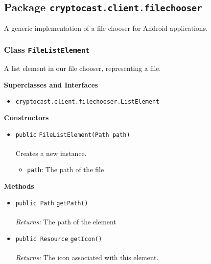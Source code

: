 \subsection{Package \lstinline!cryptocast.client.filechooser!}
A generic implementation of a file chooser for Android applications.

\subsubsection{Class \lstinline|FileListElement|}
A list element in our file chooser, representing a file. \\
\noindent\begin{minipage}[t]{5cm}
\vspace{0.3em}
\hspace*{2em}
\vspace{0.3em}
\end{minipage}



\textbf{\sffamily Superclasses and Interfaces}
\begin{itemize}
\item \lstinline|cryptocast.client.filechooser.ListElement|
\end{itemize}


\textbf{\sffamily Constructors}
\begin{itemize}
\item \lstinline|public| \lstinline|FileListElement|\lstinline|(Path path)|\\ \\[-0.6em]
Creates a new instance.
\begin{itemize}
\item \lstinline|path|: The path of the file
\end{itemize}



\end{itemize}


\textbf{\sffamily Methods}
\begin{itemize}
\item \lstinline|public Path| \lstinline|getPath|\lstinline|()|\\ \\[-0.6em]
\emph{Returns:} The path of the element



\item \lstinline|public Resource| \lstinline|getIcon|\lstinline|()|\\ \\[-0.6em]
\emph{Returns:} The icon associated with this element.



\end{itemize}

